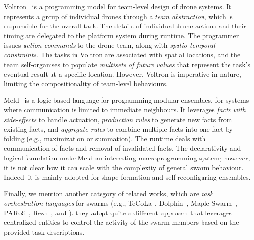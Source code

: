 Voltron~\cite{Mottola2014voltron} is a programming model for team-level design of drone systems. It represents a group of individual drones through a \emph{team abstraction}, which is responsible for the overall task. The details of individual drone actions and their timing are delegated to the platform system during runtime. The programmer issues \emph{action commands} to the drone team, along with \emph{spatio-temporal constraints}. The tasks in Voltron are associated with spatial locations, and the team self-organises to populate \emph{multisets of future values} that represent the task's eventual result at a specific location. 
%
However, Voltron is imperative in nature, limiting the compositionality of team-level behaviours.


Meld~\cite{Meld2007} is a logic-based language for programming modular ensembles,
for systems where communication is limited to immediate neighbours. 
%
It leverages 
\emph{facts with side-effects} to handle actuation, 
\emph{production rules} to generate new facts from existing facts, 
and \emph{aggregate rules} to combine multiple facts into one fact by folding (e.g., maximization or summation).
%
The runtime deals with communication of facts and removal of invalidated facts.
%
The declarativity and logical foundation 
 make Meld an interesting macroprogramming system;
 however, it is not clear how it can scale with the complexity of general swarm behaviour.
%
Indeed, it is mainly adopted for shape formation and self-reconfiguring ensembles.

Finally, we mention another category of related works, which are \emph{task orchestration languages} for swarms (e.g.,  TeCoLa~\cite{Koutsoubelias2016tecola},
 Dolphin~\cite{lima2018dolphin},
 Maple-Swarm~\cite{DBLP:conf/isola/KosakHBWHR20}, 
 PARoS~\cite{paros},
 Resh~\cite{DBLP:conf/icra/CarrollNS21}, 
 and \cite{DBLP:conf/iros/YiDLD0WY20}): they adopt quite a different approach that leverages centralized entities to control the activity of the swarm members based on the provided task descriptions.
%

